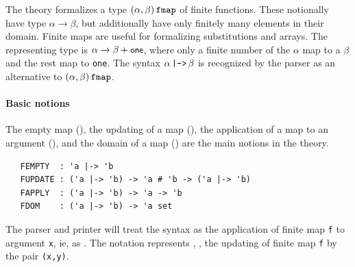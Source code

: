 {The theory  formalizes a type
$(\alpha,\beta)\,\holtxt{fmap}$ of finite functions. These notionally
have type $\alpha\to\beta$, but additionally have only finitely many
elements in their domain. Finite maps are useful for formalizing
substitutions and arrays. The representing type is $\alpha\to\beta +
\mbox{\small{\textbf{\sf{one}}}}$, where only a finite number of the $\alpha$ map to a
$\beta$ and the rest map to \verb+one+. The syntax
$\alpha\,\holtxt{|->}\,\beta$ is recognized by the parser as an
alternative to $(\alpha,\beta)\,\holtxt{fmap}$.

\paragraph {Basic notions}

The empty map (), the updating of a map
(), the application of a map to an argument
(), and the domain of a map () are the
main notions in the theory.
\begin{hol}
\begin{verbatim}
   FEMPTY  : 'a |-> 'b
   FUPDATE : ('a |-> 'b) -> 'a # 'b -> ('a |-> 'b)
   FAPPLY  : ('a |-> 'b) -> 'a -> 'b
   FDOM    : ('a |-> 'b) -> 'a set
\end{verbatim}
\end{hol}

The \HOL{} parser and printer will treat the syntax  as
the application of finite map \verb+f+ to argument \verb+x+, ie, as
. The notation  represents
, \ie, the updating of finite map
\verb+f+ by the pair \verb+(x,y)+.

}
